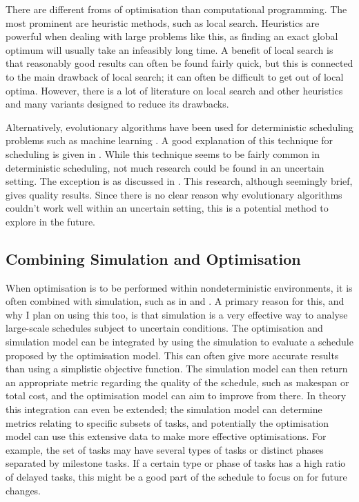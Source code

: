 \documentclass[a4paper,12pt]{article}
\begin{document}
\bigskip

There are different froms of optimisation than computational programming. The most prominent are heuristic methods, such as local search. Heuristics are powerful when dealing with large problems like this, as finding an exact global optimum will usually take an infeasibly long time. A benefit of local search is that reasonably good results can often be found fairly quick, but this is connected to the main drawback of local search; it can often be difficult to get out of local optima. However, there is a lot of literature on local search and other heuristics and many variants designed to reduce its drawbacks. 

Alternatively, evolutionary algorithms have been used for deterministic scheduling problems such as machine learning \cite{dorndorf1995evolution}. A good explanation of this technique for scheduling is given in \cite{cotta2007memetic}. While this technique seems to be fairly common in deterministic scheduling, not much research could be found in an uncertain setting. The exception is \cite{sevaux2002genetic} as discussed in . This research, although seemingly brief, gives quality results. Since there is no clear reason why evolutionary algorithms couldn't work well within an uncertain setting, this is a potential method to explore in the future. 

\subsection{Combining Simulation and Optimisation} \label{ss:simopt}
When optimisation is to be performed within nondeterministic environments, it is often combined with simulation, such as in \cite{de2003integrating} and \cite{bard2015integrating}. A primary reason for this, and why I plan on using this too, is that simulation is a very effective way to analyse large-scale schedules subject to uncertain conditions. The optimisation and simulation model can be integrated by using the simulation to evaluate a schedule proposed by the optimisation model. This can often give more accurate results than using a simplistic objective function. The simulation model can then return an appropriate metric regarding the quality of the schedule, such as makespan or total cost, and the optimisation model can aim to improve from there. In theory this integration can even be extended; the simulation model can determine metrics relating to specific subsets of tasks, and potentially the optimisation model can use this extensive data to make more effective optimisations. For example, the set of tasks may have several types of tasks or distinct phases separated by milestone tasks. If a certain type or phase of tasks has a high ratio of delayed tasks, this might be a good part of the schedule to focus on for future changes. 
\end{document}
